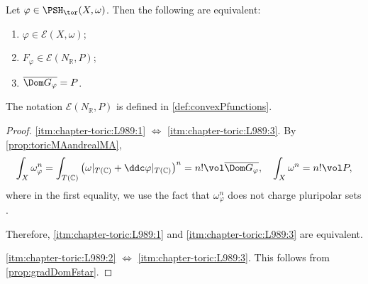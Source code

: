 \begin{proposition}\label{prop:toric-ample:L1003}
    Let $\varphi\in \PSH_{\tor}(X,\omega)$. Then the following are equivalent:
    \begin{enumerate}
        \item\label{itm:chapter-toric:L989:1} $\varphi\in \mathcal{E}(X,\omega)$;
        \item\label{itm:chapter-toric:L989:2} $F_{\varphi}\in \mathcal{E}(N_{\mathbb{R}},P)$;
        \item\label{itm:chapter-toric:L989:3} $\overline{\Dom G_{\varphi}}=P$.
    \end{enumerate}
\end{proposition}
The notation $\mathcal{E}(N_{\mathbb{R}},P)$ is defined in \cref{def:convexPfunctions}.
\begin{proof}
\ref{itm:chapter-toric:L989:1} $\iff$ \ref{itm:chapter-toric:L989:3}. By \cref{prop:toricMAandrealMA},
    \[
        \int_X \omega_{\varphi}^n=\int_{T(\mathbb{C})} \left(\omega|_{T(\mathbb{C})}+\ddc \varphi|_{T(\mathbb{C})} \right)^n= n! \vol\overline {\Dom G_{\varphi}},\quad \int_X \omega^n=n!\vol P,
    \]
    where in the first equality, we use the fact that $\omega_{\varphi}^n$ does not charge pluripolar sets .

    Therefore, \ref{itm:chapter-toric:L989:1} and \ref{itm:chapter-toric:L989:3} are equivalent.

\ref{itm:chapter-toric:L989:2} $\iff$ \ref{itm:chapter-toric:L989:3}. This follows from \cref{prop:gradDomFstar}.
\end{proof}

